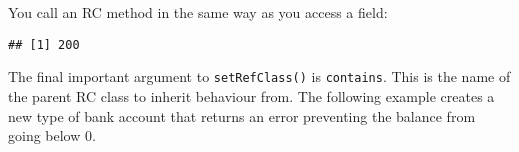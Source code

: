 \begin{Shaded}
\begin{Highlighting}[]
\StringTok{ }\NormalTok{(}\NormalTok{,}
   \NormalTok{(} \NormalTok{),}
   \NormalTok{(}
     
\StringTok{ }\OperatorTok{-}\StringTok{ }
\NormalTok{    \},}
     
\StringTok{ }\OperatorTok{+}\StringTok{ }
\NormalTok{    \}}
\NormalTok{  )}
\NormalTok{)}
\end{Highlighting}
\end{Shaded}

You call an RC method in the same way as you access a field:

\begin{Shaded}
\begin{Highlighting}[]
\StringTok{ }\OperatorTok{$}\NormalTok{(} \NormalTok{)}
\OperatorTok{$}\NormalTok{(}\NormalTok{)}
\OperatorTok{$}
\end{Highlighting}
\end{Shaded}

\begin{verbatim}
## [1] 200
\end{verbatim}

The final important argument to \texttt{setRefClass()} is
\texttt{contains}. This is the name of the parent RC class to inherit
behaviour from. The following example creates a new type of bank account
that returns an error preventing the balance from going below 0.

\begin{Shaded}
\begin{Highlighting}[]
\StringTok{ }\NormalTok{(}\NormalTok{,}
   \NormalTok{,}
   \NormalTok{(}
     
      \OperatorTok{<}\StringTok{ }\NormalTok{(}\NormalTok{)}
\StringTok{ }\OperatorTok{-}\StringTok{ }
\NormalTok{    \}}
\NormalTok{  )}
\NormalTok{)}
\StringTok{ }\OperatorTok{$}\NormalTok{(} \NormalTok{)}
\OperatorTok{$}\NormalTok{(}\NormalTok{)}
\OperatorTok{$}
\end{Highlighting}
\end{Shaded}

